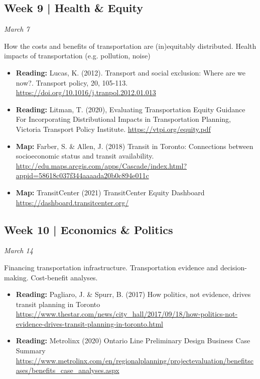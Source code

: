 \documentclass[11pt]{article}
\begin{document}
	
	\subsection*{Week 9 | Health \& Equity}
	
	\textit{March 7}
	
	How the costs and benefits of transportation are (in)equitably distributed. Health impacts of transportation (e.g. pollution, noise)
	
	\begin{itemize}
		\item \textbf{Reading:} Lucas, K. (2012). Transport and social exclusion: Where are we now?. Transport policy, 20, 105-113. \url{https://doi.org/10.1016/j.tranpol.2012.01.013}
		
		\item \textbf{Reading:} Litman, T. (2020), Evaluating Transportation Equity Guidance For Incorporating Distributional Impacts in Transportation Planning, Victoria Transport Policy Institute. \url{https://vtpi.org/equity.pdf}
		
		\item \textbf{Map:} Farber, S. \& Allen, J. (2018) Transit in Toronto: Connections between socioeconomic status and transit availability. \\ \url{http://edu.maps.arcgis.com/apps/Cascade/index.html?appid=58618c037f344aaaada20b0c894e011c}
		
		\item \textbf{Map:} TransitCenter (2021) TransitCenter Equity Dashboard \\ \url{https://dashboard.transitcenter.org/}
	\end{itemize}
	
	
	
	
	
	\subsection*{Week 10 | Economics \& Politics}
	
	\textit{March 14}
	
	Financing transportation infrastructure. Transportation evidence and decision-making. Cost-benefit analyses. 
	
	\begin{itemize}
		
		\item \textbf{Reading:} Pagliaro, J. \& Spurr, B. (2017) How politics, not evidence, drives transit planning in Toronto \\ \url{https://www.thestar.com/news/city_hall/2017/09/18/how-politics-not-evidence-drives-transit-planning-in-toronto.html}
		
		\item \textbf{Reading:} Metrolinx (2020) Ontario Line Preliminary Design 
		Business Case Summary \\
		\url{https://www.metrolinx.com/en/regionalplanning/projectevaluation/benefitscases/benefits_case_analyses.aspx}
		
		
	\end{itemize}
	
\end{document}
